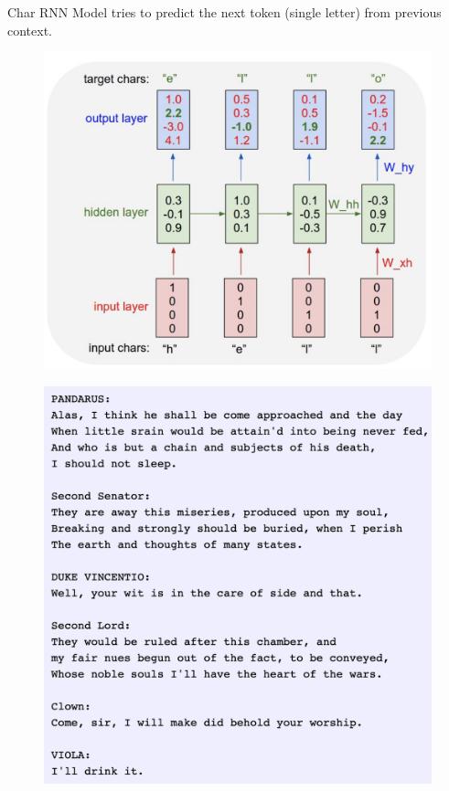 \begin{frame}{Char RNN}
	Model tries to predict the next token (single letter) from previous context.
	\begin{minipage}[t]{0.55\columnwidth}
		\begin{figure}
			\centering
			\includegraphics[width=1.0\linewidth]{figs/char_rnn.png}
		\end{figure}
	\end{minipage}%
	\begin{minipage}[t]{0.44\columnwidth}
		\begin{figure}
			\centering
			\includegraphics[width=1.0\linewidth]{figs/char_rnn_output.png}
		\end{figure}
	\end{minipage}
\end{frame}
